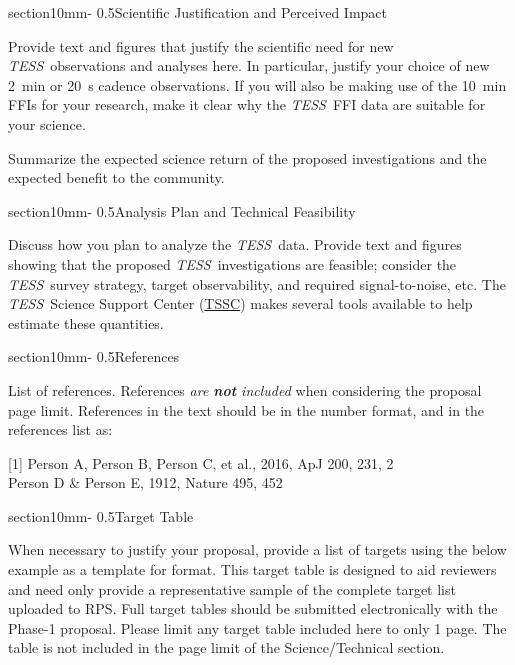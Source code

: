 \documentclass[letterpaper,12pt]{article}
\makeatletter
\renewcommand{\section}{\@startsection%
{section}{1}{0mm}{-\baselineskip}%
{0.5\baselineskip}{\normalfont\Large\bfseries}}%
\newcommand{\tess}{{\it TESS}}
\makeatother
\begin{document}
\section{Scientific Justification and Perceived Impact}

Provide text and figures that justify the scientific need for new \tess\ observations and analyses here. In particular, justify your choice of new 2~min or 20~s cadence observations. If you will also be making use of the 10~min FFIs for your research, make it clear why the \tess\ FFI data are suitable for your science.


Summarize the expected science return of the proposed investigations and the expected benefit to the community.



\section{Analysis Plan and Technical Feasibility}

Discuss how you plan to analyze the \tess\ data. Provide text and figures showing that the proposed \tess\ investigations are feasible; consider the 
\tess\ survey strategy, target observability, and required signal-to-noise, etc. The \tess\ Science 
Support Center (\href{https://heasarc.gsfc.nasa.gov/docs/tess/}{TSSC}) makes several tools available to help estimate these quantities. 


\section{References}

List of references. References {\it are {\bf not} included} when considering the
proposal page limit. References in the text should be in the number format, and in the references list as:

[1] Person A, Person B, Person C, et al., 2016, ApJ 200, 231, 2\\
[2] Person D \& Person E, 1912, Nature 495, 452


\section{Target Table}

When necessary to justify your proposal, provide a list of targets using the below example as a template for format. This target table is designed to aid reviewers and need only provide a representative sample of the complete target list uploaded to RPS. Full target tables should be submitted electronically with the Phase-1 proposal. Please limit any target table included here to only 1 page. The table is not included in the page limit of the Science/Technical section. 
\end{document}
